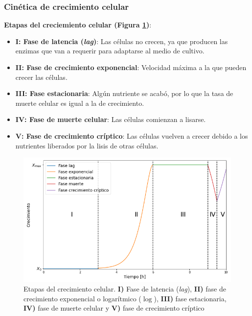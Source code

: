         \subsubsection{Cinética de crecimiento celular}
        
        \textbf{Etapas del creciemiento celular (Figura \ref{fig:crecimiento_celular_etapas})}:
        
        \begin{itemize}
            \item \textbf{I: Fase de latencia (\textit{lag})}: Las células no crecen, ya que producen las enzimas que van a requerir para adaptarse al medio de cultivo.
            \item \textbf{II: Fase de crecimiento exponencial}: Velocidad máxima a la que pueden crecer las células.
            \item \textbf{III: Fase estacionaria}: Algún nutriente se acabó, por lo que la tasa de muerte celular es igual a la de crecimiento.
            \item \textbf{IV: Fase de muerte celular}: Las células comienzan a lisarse.
            \item \textbf{V: Fase de crecimiento críptico}: Las células vuelven a crecer debido a los nutrientes liberados por la lisis de otras células.
        \end{itemize}
        
        \begin{figure}
            \centering
            \includegraphics[width=.9\textwidth]{img/graficos/crecimiento_celular_etapas.png}
            \caption[Etapas del crecimiento celular]{Etapas del crecimiento celular. \textbf{I)} Fase de latencia (\textit{lag}), \textbf{II)} fase de crecimiento exponencial o logarítmico (\(\log\)), \textbf{III)} fase estacionaria, \textbf{IV)} fase de muerte celular y \textbf{V)} fase de crecimiento críptico}
            \label{fig:crecimiento_celular_etapas}
        \end{figure}
        
